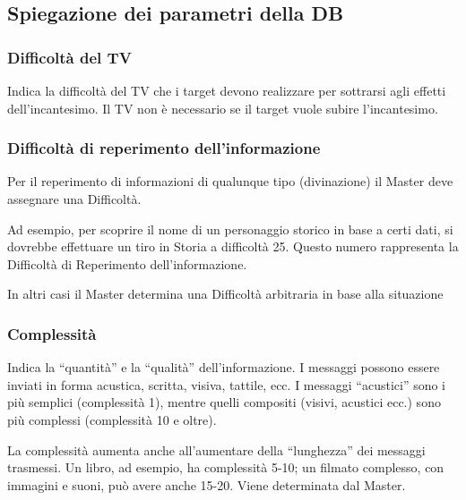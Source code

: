 
{\raggedright \subsection{Spiegazione dei parametri della DB}}

\subsubsection{Difficolt\`a del TV}
Indica la difficolt\`a del TV che i target devono realizzare per sottrarsi
agli effetti dell'incantesimo. Il TV non \`e necessario se il target vuole
subire l'incantesimo. 

\subsubsection{Difficolt\`a di reperimento dell'informazione}
Per il reperimento di informazioni di qualunque tipo (divinazione) il
Master deve assegnare una Difficolt\`a.

Ad esempio, per scoprire il nome di un personaggio
storico in base a certi dati, si dovrebbe effettuare un tiro in Storia a difficolt\`a
25. Questo numero rappresenta la Difficolt\`a di Reperimento dell'informazione.

In altri casi il Master determina una Difficolt\`a arbitraria in base alla
situazione

\subsubsection{Complessit\`a}

Indica la ``quantit\`a'' e la ``qualit\`a'' dell'informazione. I
messaggi possono essere inviati in forma acustica, scritta, visiva,
tattile, ecc. I messaggi ``acustici'' sono i pi\`u semplici
(complessit\`a 1), mentre quelli compositi (visivi, acustici ecc.)
sono pi\`u complessi (complessit\`a 10 e oltre).

La complessit\`a aumenta anche all'aumentare
della ``lunghezza'' dei messaggi trasmessi. Un libro, ad esempio, ha complessit\`a
5-10; un filmato complesso, con immagini e suoni, pu\`o avere anche 15-20.
Viene determinata dal Master.

